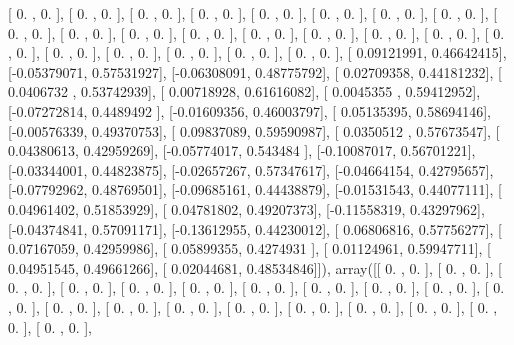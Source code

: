 \documentclass{article}
\begin{document}
       [ 0.        ,  0.        ],
       [ 0.        ,  0.        ],
       [ 0.        ,  0.        ],
       [ 0.        ,  0.        ],
       [ 0.        ,  0.        ],
       [ 0.        ,  0.        ],
       [ 0.        ,  0.        ],
       [ 0.        ,  0.        ],
       [ 0.        ,  0.        ],
       [ 0.        ,  0.        ],
       [ 0.        ,  0.        ],
       [ 0.        ,  0.        ],
       [ 0.        ,  0.        ],
       [ 0.        ,  0.        ],
       [ 0.        ,  0.        ],
       [ 0.        ,  0.        ],
       [ 0.        ,  0.        ],
       [ 0.        ,  0.        ],
       [ 0.        ,  0.        ],
       [ 0.        ,  0.        ],
       [ 0.        ,  0.        ],
       [ 0.        ,  0.        ],
       [ 0.09121991,  0.46642415],
       [-0.05379071,  0.57531927],
       [-0.06308091,  0.48775792],
       [ 0.02709358,  0.44181232],
       [ 0.0406732 ,  0.53742939],
       [ 0.00718928,  0.61616082],
       [ 0.0045355 ,  0.59412952],
       [-0.07272814,  0.4489492 ],
       [-0.01609356,  0.46003797],
       [ 0.05135395,  0.58694146],
       [-0.00576339,  0.49370753],
       [ 0.09837089,  0.59590987],
       [ 0.0350512 ,  0.57673547],
       [ 0.04380613,  0.42959269],
       [-0.05774017,  0.543484  ],
       [-0.10087017,  0.56701221],
       [-0.03344001,  0.44823875],
       [-0.02657267,  0.57347617],
       [-0.04664154,  0.42795657],
       [-0.07792962,  0.48769501],
       [-0.09685161,  0.44438879],
       [-0.01531543,  0.44077111],
       [ 0.04961402,  0.51853929],
       [ 0.04781802,  0.49207373],
       [-0.11558319,  0.43297962],
       [-0.04374841,  0.57091171],
       [-0.13612955,  0.44230012],
       [ 0.06806816,  0.57756277],
       [ 0.07167059,  0.42959986],
       [ 0.05899355,  0.4274931 ],
       [ 0.01124961,  0.59947711],
       [ 0.04951545,  0.49661266],
       [ 0.02044681,  0.48534846]]), array([[ 0.        ,  0.        ],
       [ 0.        ,  0.        ],
       [ 0.        ,  0.        ],
       [ 0.        ,  0.        ],
       [ 0.        ,  0.        ],
       [ 0.        ,  0.        ],
       [ 0.        ,  0.        ],
       [ 0.        ,  0.        ],
       [ 0.        ,  0.        ],
       [ 0.        ,  0.        ],
       [ 0.        ,  0.        ],
       [ 0.        ,  0.        ],
       [ 0.        ,  0.        ],
       [ 0.        ,  0.        ],
       [ 0.        ,  0.        ],
       [ 0.        ,  0.        ],
       [ 0.        ,  0.        ],
       [ 0.        ,  0.        ],
       [ 0.        ,  0.        ],
       [ 0.        ,  0.        ],
\end{document}
